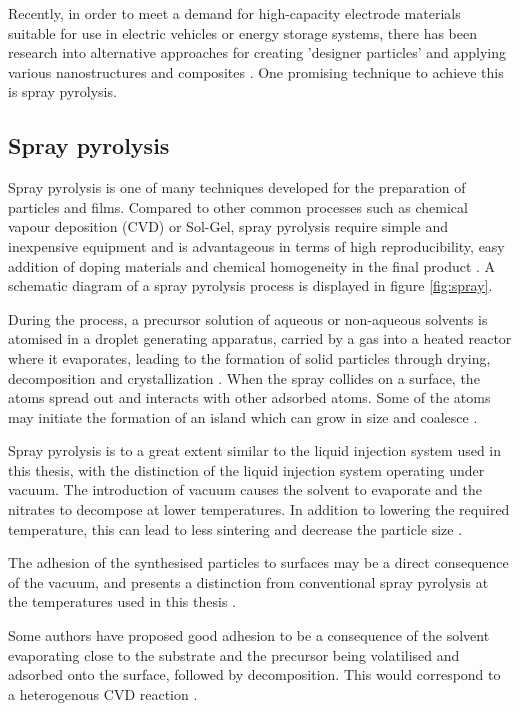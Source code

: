 \documentclass[Main/main.tex]{subfiles}
\begin{document}
Recently, in order to meet a demand for high-capacity electrode materials suitable for use in electric vehicles or energy storage systems, there has been research into alternative approaches for creating 'designer particles' and applying various nanostructures and composites \cite{elmat_sprayp}. One promising technique to achieve this is spray pyrolysis.

\subsection*{Spray pyrolysis}
Spray pyrolysis is one of many techniques developed for the preparation of particles and films. Compared to other common processes such as chemical vapour deposition (CVD) or Sol-Gel, spray pyrolysis require simple and inexpensive equipment and is advantageous in terms of high reproducibility, easy addition of doping materials and chemical homogeneity in the final product \cite{1_Pyrolysis_book}. A schematic diagram of a spray pyrolysis process is displayed in figure \ref{fig:spray}.

During the process, a precursor solution of aqueous or non-aqueous solvents is atomised in a droplet generating apparatus, carried by a gas into a heated reactor where it evaporates, leading to the formation of solid particles through drying, decomposition and crystallization \cite{elmat_sprayp,Spray_pyro}. 
When the spray collides on a surface, the atoms spread out and interacts with other adsorbed atoms. Some of the atoms may initiate the formation of an island which can grow in size and coalesce \cite{1_Pyrolysis_book}. 

Spray pyrolysis is to a great extent similar to the liquid injection system used in this thesis, with the distinction of the liquid injection system operating under vacuum. The introduction of vacuum causes the solvent to evaporate and the nitrates to decompose at lower temperatures. In addition to lowering the required temperature, this can lead to less sintering and decrease the particle size \cite{elmat_sprayp}. 

The adhesion of the synthesised particles to surfaces may be a direct consequence of the vacuum, and presents a distinction from conventional spray pyrolysis at the temperatures used in this thesis .

Some authors have proposed good adhesion to be a consequence of the solvent evaporating close to the substrate and the precursor being volatilised and adsorbed onto the surface, followed by decomposition. This would correspond to a heterogenous CVD reaction \cite{adhesion}.
\end{document}
